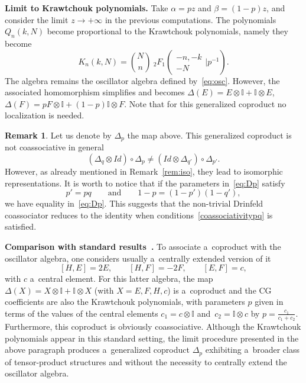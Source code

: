 \documentclass[pdftex]{sigma}
\numberwithin{equation}{section}
\theoremstyle{definition}
\newtheorem{Remark}[Theorem]{Remark}
\begin{document}
{\bf Limit to Krawtchouk polynomials.} Take $\alpha=p z$ and $\beta=(1-p)z$, and consider the limit $z\to+\infty$ in the previous computations. The polynomials $Q_n(k,N)$ become proportional to the Krawtchouk polynomials, namely they become
\[K_n(k,N)=\binom{N}{n}\ {}_2F_1\left(\begin{array}{c} -n, -k \\ -N\end{array}\Bigg\vert p^{-1}\right) .\]
The algebra remains the oscillator algebra defined by~\eqref{eq:osc}. However, the associated homomorphism simplifies and becomes
$
\Delta(E)=E\otimes \mathbb{I}+\mathbb{I} \otimes E$, $
\Delta(F)=pF\otimes \mathbb{I}+(1-p)\mathbb{I}\otimes F$.
Note that for this generalized coproduct no localization is needed.
\begin{Remark}\label{rema_coassociativitypq}
Let us denote by $\Delta_p$ the map above.
This generalized coproduct is not coassociative in general
\begin{equation}\label{eq:Dp}
 (\Delta_q\otimes Id)\circ\Delta_p \neq (Id\otimes \Delta_{q'})\circ\Delta_{p'}.
\end{equation}
However, as already mentioned in Remark~\ref{rem:iso}, they lead to isomorphic representations.
It is worth to notice that if the parameters in~\eqref{eq:Dp} satisfy
\begin{equation}\label{coassociativitypq}
p'=pq \qquad \text{and}\qquad 1-p=(1-p')(1-q'),\end{equation}
we have equality in~\eqref{eq:Dp}.
This suggests that the non-trivial Drinfeld coassociator reduces to the identity when conditions~\eqref{coassociativitypq} is satisfied.
\end{Remark}

{\bf Comparison with standard results~\cite{CVV,Zhosc}.} To associate a~coproduct with the oscillator algebra, one considers usually a~centrally extended version of it
\begin{equation}\label{eq:oscext}
[H,E]=2E,\qquad [H,F]=-2F,\qquad [E,F]=c,
\end{equation}
with $c$ a~central element.
For this latter algebra, the map $\Delta(X)=X\otimes \mathbb{I} + \mathbb{I} \otimes X$ (with $X=E,F,H,c$) is a~coproduct and the CG coefficients are also the Krawtchouk polynomials, with parameters $p$ given in terms of the values of the central elements $c_1=c\otimes \mathbb{I}$ and~${c_2=\mathbb{I} \otimes c}$ by
$ p=\frac{c_1}{c_1+c_2}$.
Furthermore, this coproduct is obviously coassociative.
Although the Krawtchouk polynomials appear in this
standard setting, the limit procedure presented in the above paragraph produces a~generalized coproduct $\Delta_p$ exhibiting a~broader class of tensor-product structures and without the necessity to centrally extend the oscillator algebra.
\end{document}
